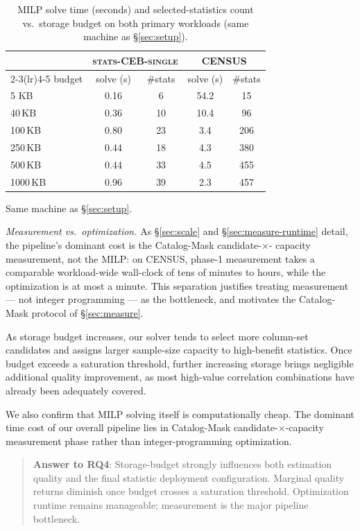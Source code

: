 \documentclass[sigconf, nonacm]{acmart}
\begin{document}
\begin{table}[t]
\caption{MILP solve time (seconds) and selected-statistics count vs.\ storage
budget on both primary workloads (same machine as \S\ref{sec:setup}).}
\label{tab:sec6solve}
\small
\begin{tabular}{lcc@{\hskip 6pt}cc}
\toprule
 & \multicolumn{2}{c}{\textsc{stats-CEB-single}} & \multicolumn{2}{c}{CENSUS}\\
\cmidrule(lr){2-3}\cmidrule(lr){4-5}
budget & solve (s) & \#stats & solve (s) & \#stats\\
\midrule
5\,\,KB     & 0.16 & 6   & 54.2 & 15\\
40\,KB    & 0.36 & 10  & 10.4 & 96\\
100\,KB   & 0.80 & 23  & 3.4  & 206\\
250\,KB   & 0.44 & 18  & 4.3  & 380\\
500\,KB   & 0.44 & 33  & 4.5  & 455\\
1000\,KB  & 0.96 & 39  & 2.3 & 457\\
\bottomrule
\end{tabular}

{\footnotesize Same machine as \S\ref{sec:setup}.}
\end{table}

\emph{Measurement vs.\ optimization.} As \S\ref{sec:scale} and \S\ref{sec:measure-runtime}
detail, the pipeline's dominant cost is the Catalog-Mask candidate-$\times$-
capacity measurement, not the MILP: on CENSUS, phase-1 measurement takes a
comparable workload-wide wall-clock of tens of minutes to hours, while the
optimization is at most a minute. This separation justifies treating
measurement --- not integer programming --- as the bottleneck, and motivates the
Catalog-Mask protocol of \S\ref{sec:measure}.

As storage budget increases, our solver tends to select more column-set candidates and assigns larger sample-size capacity to high-benefit statistics.
Once budget exceeds a saturation threshold, further increasing storage brings negligible additional quality improvement, as most high-value correlation combinations have already been adequately covered.

We also confirm that MILP solving itself is computationally cheap.
The dominant time cost of our overall pipeline lies in Catalog-Mask candidate-$\times$-capacity measurement phase rather than integer-programming optimization.

\begin{quote}
\noindent\textbf{Answer to RQ4}:
Storage-budget strongly influences both estimation quality and the final statistic deployment configuration.
Marginal quality returns diminish once budget crosses a saturation threshold.
Optimization runtime remains manageable; measurement is the major pipeline bottleneck.
\end{quote}
\end{document}

